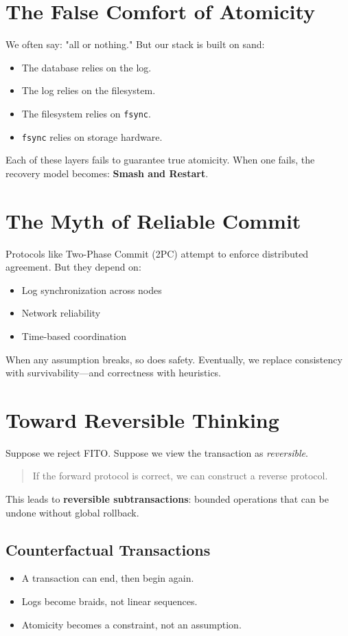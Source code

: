 \documentclass[../../../OAE-SPEC-MAIN.tex]{subfiles}
\begin{document}
\section{The False Comfort of Atomicity}
We often say: "all or nothing." But our stack is built on sand:
\begin{itemize}
  \item The database relies on the log.
  \item The log relies on the filesystem.
  \item The filesystem relies on \texttt{fsync}.
  \item \texttt{fsync} relies on storage hardware.
\end{itemize}
Each of these layers fails to guarantee true atomicity. When one fails, the recovery model becomes:\textbf{ Smash and Restart}.

\section{The Myth of Reliable Commit}
Protocols like Two-Phase Commit (2PC) attempt to enforce distributed agreement. But they depend on:
\begin{itemize}
  \item Log synchronization across nodes
  \item Network reliability
  \item Time-based coordination
\end{itemize}

When any assumption breaks, so does safety. Eventually, we replace consistency with survivability—and correctness with heuristics.

\section{Toward Reversible Thinking}
Suppose we reject FITO. Suppose we view the transaction as \emph{reversible}. 

\begin{quote}
If the forward protocol is correct, we can construct a reverse protocol.
\end{quote}

This leads to \textbf{reversible subtransactions}: bounded operations that can be undone without global rollback.

\subsection*{Counterfactual Transactions}
\begin{itemize}
  \item A transaction can end, then begin again.
  \item Logs become braids, not linear sequences.
  \item Atomicity becomes a constraint, not an assumption.
\end{itemize}
\end{document}
